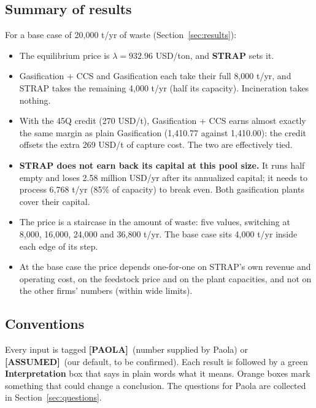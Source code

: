 \documentclass[11pt]{article}
\newcommand{\PAOLA}{\textcolor{paolacolor}{\textbf{[PAOLA]}}}
\newcommand{\ASSUMED}{\textcolor{assumedcolor}{\textbf{[ASSUMED]}}}
\newcommand{\usd}{USD}
\begin{document}
\subsection{Summary of results}

For a base case of 20{,}000 t/yr of waste (Section~\ref{sec:results}):
\begin{itemize}[leftmargin=1.6em,itemsep=0.2em]
  \item The equilibrium price is $\lambda=932.96$ \usd/ton, and \textbf{STRAP} sets it.
  \item Gasification + CCS and Gasification each take their full 8{,}000 t/yr, and
        STRAP takes the remaining 4{,}000 t/yr (half its capacity). Incineration
        takes nothing.
  \item With the 45Q credit (270 \usd/t), Gasification + CCS earns almost exactly
        the same margin as plain Gasification (1{,}410.77 against 1{,}410.00): the
        credit offsets the extra 269 \usd/t of capture cost. The two are effectively
        tied.
  \item \textbf{STRAP does not earn back its capital at this pool size.} It runs half
        empty and loses 2.58 million \usd/yr after its annualized capital; it needs
        to process 6{,}768 t/yr (85\% of capacity) to break even. Both gasification
        plants cover their capital.
  \item The price is a staircase in the amount of waste: five values, switching at
        8{,}000, 16{,}000, 24{,}000 and 36{,}800 t/yr. The base case sits
        4{,}000 t/yr inside each edge of its step.
  \item At the base case the price depends one-for-one on STRAP's own revenue and
        operating cost, on the feedstock price and on the plant capacities, and
        not on the other firms' numbers (within wide limits).
\end{itemize}

\subsection{Conventions}

Every input is tagged \PAOLA\ (number supplied by Paola) or \ASSUMED\ (our default,
to be confirmed). Each result is followed by a green \textbf{Interpretation} box
that says in plain words what it means. Orange boxes mark something that could
change a conclusion. The questions for Paola are collected in
Section~\ref{sec:questions}.

\end{document}

